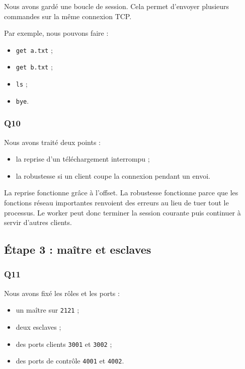 \documentclass[a4paper,11pt]{article}
\begin{document}
Nous avons gardé une boucle de session. Cela permet d'envoyer plusieurs
commandes sur la même connexion TCP.

Par exemple, nous pouvons faire :

\begin{itemize}[leftmargin=*]
    \item \texttt{get a.txt} ;
    \item \texttt{get b.txt} ;
    \item \texttt{ls} ;
    \item \texttt{bye}.
\end{itemize}

\subsubsection{Q10}

Nous avons traité deux points :

\begin{itemize}[leftmargin=*]
    \item la reprise d'un téléchargement interrompu ;
    \item la robustesse si un client coupe la connexion pendant un envoi.
\end{itemize}

La reprise fonctionne grâce à l'offset. La robustesse fonctionne parce que les
fonctions réseau importantes renvoient des erreurs au lieu de tuer tout le
processus. Le worker peut donc terminer la session courante puis continuer à
servir d'autres clients.

\subsection{Étape 3 : maître et esclaves}

\subsubsection{Q11}

Nous avons fixé les rôles et les ports :

\begin{itemize}[leftmargin=*]
    \item un maître sur \texttt{2121} ;
    \item deux esclaves ;
    \item des ports clients \texttt{3001} et \texttt{3002} ;
    \item des ports de contrôle \texttt{4001} et \texttt{4002}.
\end{itemize}
\end{document}
